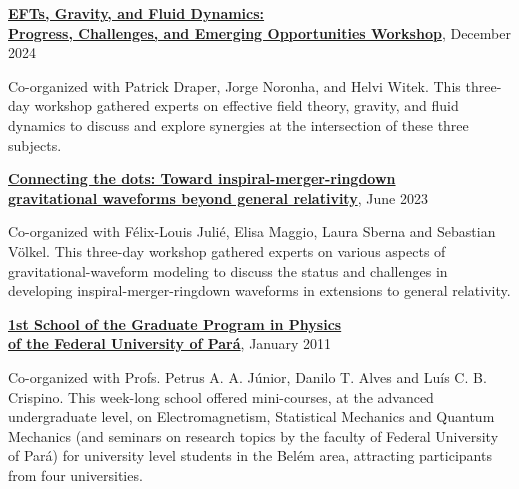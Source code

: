 \documentclass[10pt]{article}
\newcommand{\halfblankline}{\quad\vspace{-0.5\baselineskip}\pagebreak[3]}
\begin{document}
\halfblankline

\href{https://publish.illinois.edu/efts-gravity-fluid-dynamics/}
{\textbf{EFTs, Gravity, and Fluid Dynamics:\\ Progress, Challenges, and Emerging Opportunities Workshop}},
\hfill{December 2024}

\begin{innerlist}
    \item Co-organized with Patrick Draper, Jorge Noronha, and
        Helvi Witek. This three-day workshop gathered experts on
        effective field theory, gravity, and fluid dynamics to
        discuss and explore synergies at the intersection of these
        three subjects.
\end{innerlist}

\halfblankline

\href{https://workshops.aei.mpg.de/connecting-the-dots/}
{\textbf{Connecting the dots: Toward inspiral-merger-ringdown \\ gravitational waveforms beyond general relativity}},
\hfill{June 2023}

\begin{innerlist}
    \item Co-organized with F\'elix-Louis Juli\'e, Elisa Maggio, Laura Sberna
        and Sebastian V\"olkel. This three-day workshop gathered experts on
        various aspects of gravitational-waveform modeling to discuss the
        status and challenges in developing inspiral-merger-ringdown waveforms
        in extensions to general relativity.
\end{innerlist}

\halfblankline

\href{http://www.ufpa.br/ppgf/ippgf.html}
{\textbf{1st School of the Graduate Program in Physics \\ of the Federal University of Par\'a}},
\hfill{January 2011}

\begin{innerlist}
    \item Co-organized with Profs. Petrus A. A. J\'unior,
    Danilo T. Alves and Lu\'is C. B. Crispino. This week-long school offered
    mini-courses, at the advanced undergraduate level, on Electromagnetism,
    Statistical Mechanics and Quantum Mechanics (and seminars on research
    topics by the faculty of Federal University of Par\'a) for
    university level students in the Bel\'em area, attracting participants
    from four universities.
\end{innerlist}
\end{document}

